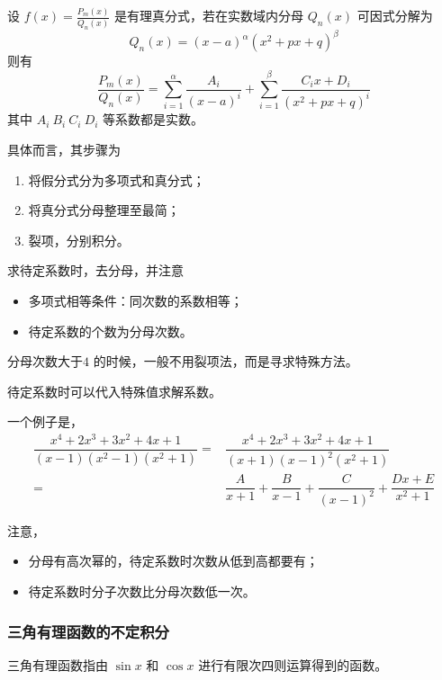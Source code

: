 \begin{Theo}[]

    设 $ f(x)=\frac{P_m(x)}{Q_n(x)}$ 是有理真分式，若在实数域内分母 $ Q_n(x) $ 可因式分解为 $$
        Q_n(x)=(x-a)^\alpha(x^2+px+q)^\beta
    $$ 
    则有$$
        \frac{P_m(x)}{Q_n(x)}=\sum_{i=1}^\alpha \frac{A_i}{(x-a)^i}+
        \sum_{i=1}^\beta \frac{C_ix+D_i}{(x^2+px+q)^i}
    $$ 其中 $ A_i\ B_i\ C_i\ D_i $ 等系数都是实数。
\end{Theo}

具体而言，其步骤为
\begin{enumerate}
    \item 将假分式分为多项式和真分式；
    \item 将真分式分母整理至最简；
    \item 裂项，分别积分。
\end{enumerate}

求待定系数时，去分母，并注意\begin{itemize}
    \item 多项式相等条件：同次数的系数相等；
    \item 待定系数的个数为分母次数。
\end{itemize}

分母次数大于$ 4 $ 的时候，一般不用裂项法，而是寻求特殊方法。

待定系数时可以代入特殊值求解系数。

一个例子是，
\begin{equation*}
    \begin{aligned}
        \dfrac{x^4+2x^3+3x^2+4x+1}{(x-1)(x^2-1)(x^2+1)}=&\dfrac{x^4+2x^3+3x^2+4x+1}{(x+1)(x-1)^2(x^2+1)}\\ 
        =& \dfrac{A}{x+1} + \dfrac{B}{x-1} + \dfrac{C}{(x-1)^2} + \dfrac{Dx+E}{x^2+1}
    \end{aligned}
\end{equation*}

注意，
\begin{itemize}
    \item 分母有高次幂的，待定系数时次数从低到高都要有；
    \item 待定系数时分子次数比分母次数低一次。
\end{itemize}

\subsubsection{三角有理函数的不定积分}

三角有理函数指由 $ \sin x $ 和 $ \cos x $ 进行有限次四则运算得到的函数。

